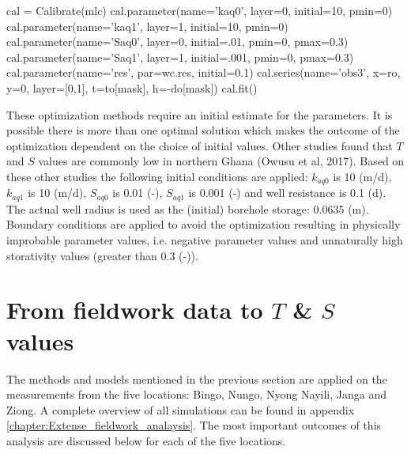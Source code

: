 \begin{python}[h!]
cal = Calibrate(mlc)
cal.parameter(name='kaq0', layer=0, initial=10, pmin=0)
cal.parameter(name='kaq1', layer=1, initial=10, pmin=0)
cal.parameter(name='Saq0', layer=0, initial=.01, pmin=0, pmax=0.3)
cal.parameter(name='Saq1', layer=1, initial=.001, pmin=0, pmax=0.3)
cal.parameter(name='res', par=wc.res, initial=0.1)
cal.series(name='obs3', x=ro, y=0, layer=[0,1], t=to[mask], h=-do[mask])
cal.fit()
\end{python}

These optimization methods require an initial estimate for the parameters. It is possible there is more than one optimal solution which makes the outcome of the optimization dependent on the choice of initial values. Other studies found that $T$ and $S$ values are commonly low in northern Ghana (Owusu et al, 2017). Based on these other studies the following initial conditions are applied: $k_{aq0}$ is 10 (m/d), $k_{aq1}$ is 10 (m/d), $S_{aq0}$ is 0.01 (-), $S_{aq1}$ is 0.001 (-) and well resistance is 0.1 (d). The actual well radius is used as the (initial) borehole storage: 0.0635 (m). Boundary conditions are applied to avoid the optimization resulting in physically improbable parameter values, i.e. negative parameter values and unnaturally high storativity values (greater than 0.3 (-)).\


\section{From fieldwork data to $T$ \& $S$ values}
\label{section:TS}
The methods and models mentioned in the previous section are applied on the measurements from the five locations: Bingo, Nungo, Nyong Nayili, Janga and Ziong. A complete overview of all simulations can be found in appendix \ref{chapter:Extense_fieldwork_analaysis}. The most important outcomes of this analysis are discussed below for each of the five locations.

